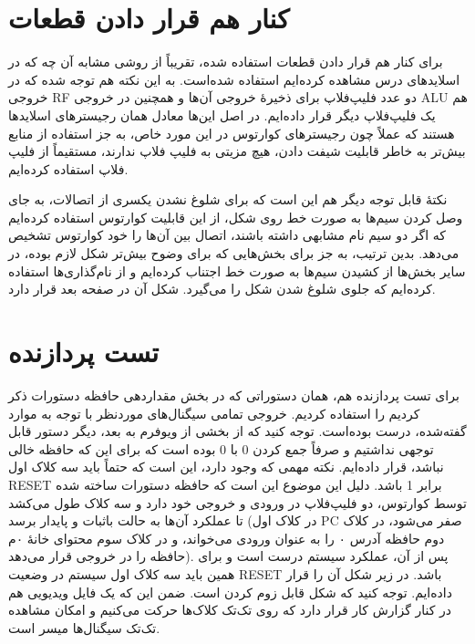 \documentclass[12pt,titlepage,a4page , tikz , multi,table , svgnames,xcdraw]{article}
\begin{document}
\section{کنار هم قرار دادن قطعات}

برای کنار هم قرار دادن قطعات استفاده شده، تقریباً از روشی مشابه آن چه که در اسلایدهای درس مشاهده کرده‌ایم استفاده شده‌است. به این نکته هم توجه شده که در خروجی RF دو عدد فلیپ‌فلاپ برای ذخیرهٔ خروجی آن‌ها و همچنین در خروجی ALU هم یک فلیپ‌فلاپ دیگر قرار داده‌ایم. در اصل این‌ها معادل همان رجیسترهای اسلایدها هستند که عملاً چون رجیسترهای کوارتوس در این مورد خاص، به جز استفاده از منابع بیش‌تر به خاطر قابلیت شیفت دادن، هیچ مزیتی به فلیپ فلاپ ندارند، مستقیماً از فلیپ فلاپ استفاده کرده‌ایم.

نکتهٔ قابل توجه دیگر هم این است که برای شلوغ نشدن یکسری از اتصالات، به جای وصل کردن سیم‌ها به صورت خط روی شکل، از این قابلیت کوارتوس استفاده کرده‌ایم که اگر دو سیم نام مشابهی داشته باشند، اتصال بین آن‌ها را خود کوارتوس تشخیص می‌دهد. بدین ترتیب، به جز برای بخش‌هایی که برای وضوح بیش‌تر شکل لازم بوده، در سایر بخش‌ها از کشیدن سیم‌ها به صورت خط اجتناب کرده‌ایم و از نام‌گذاری‌ها استفاده کرده‌ایم که جلوی شلوغ شدن شکل را می‌گیرد. شکل آن در صفحه بعد قرار دارد.



\begin{landscape}

\thispagestyle{empty}




\end{landscape}

\section{تست پردازنده}

برای تست پردازنده هم، همان دستوراتی که در بخش مقداردهی حافظه دستورات ذکر کردیم را استفاده کردیم. خروجی تمامی سیگنال‌های موردنظر با توجه به موارد گفته‌شده، درست بوده‌است. توجه کنید که از بخشی از ویوفرم به بعد، دیگر دستور قابل توجهی نداشتیم و صرفاً جمع کردن $0$ با $0$ بوده است که برای این که حافظه خالی نباشد، قرار داده‌ایم. نکته مهمی که وجود دارد، این است که حتماً باید سه کلاک اول RESET برابر 1 باشد. دلیل این موضوع این است که حافظه دستورات ساخته شده توسط کوارتوس، دو فلیپ‌فلاپ در ورودی و خروجی خود دارد و سه کلاک طول می‌کشد تا عملکرد آن‌ها به حالت باثبات و پایدار برسد (در کلاک اول PC صفر می‌شود، در کلاک دوم حافظه آدرس ۰ را به عنوان ورودی می‌خواند، و در کلاک سوم محتوای خانهٔ ۰م حافظه را در خروجی قرار می‌دهد). پس از آن، عملکرد سیستم درست است و برای همین باید سه کلاک اول سیستم در وضعیت RESET باشد. در زیر شکل آن را قرار داده‌ایم. توجه کنید که شکل قابل زوم کردن است. ضمن این که یک فایل ویدیویی هم در کنار گزارش کار قرار دارد که روی تک‌تک کلاک‌ها حرکت می‌کنیم و امکان مشاهده تک‌تک سیگنال‌ها میسر است.
\end{document}
